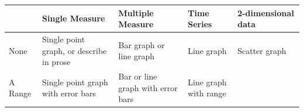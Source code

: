 \documentclass[]{book}
\begin{document}
\begin{longtable}[]{@{}lllll@{}}
\toprule
\begin{minipage}[b]{0.17\columnwidth}\raggedright\strut
\strut
\end{minipage} & \begin{minipage}[b]{0.33\columnwidth}\raggedright\strut
Single Measure\strut
\end{minipage} & \begin{minipage}[b]{0.14\columnwidth}\raggedright\strut
Multiple Measure\strut
\end{minipage} & \begin{minipage}[b]{0.10\columnwidth}\raggedright\strut
Time Series\strut
\end{minipage} & \begin{minipage}[b]{0.12\columnwidth}\raggedright\strut
2-dimensional data\strut
\end{minipage}\tabularnewline
\midrule
\endhead
\begin{minipage}[t]{0.17\columnwidth}\raggedright\strut
None\strut
\end{minipage} & \begin{minipage}[t]{0.33\columnwidth}\raggedright\strut
Single point graph, or describe in prose\strut
\end{minipage} & \begin{minipage}[t]{0.14\columnwidth}\raggedright\strut
Bar graph or line graph\strut
\end{minipage} & \begin{minipage}[t]{0.10\columnwidth}\raggedright\strut
Line graph\strut
\end{minipage} & \begin{minipage}[t]{0.12\columnwidth}\raggedright\strut
Scatter graph\strut
\end{minipage}\tabularnewline
\begin{minipage}[t]{0.17\columnwidth}\raggedright\strut
A Range\strut
\end{minipage} & \begin{minipage}[t]{0.33\columnwidth}\raggedright\strut
Single point graph with error bars\strut
\end{minipage} & \begin{minipage}[t]{0.14\columnwidth}\raggedright\strut
Bar or line graph with error bars\strut
\end{minipage} & \begin{minipage}[t]{0.10\columnwidth}\raggedright\strut
Line graph with range\strut
\end{minipage} & \begin{minipage}[t]{0.12\columnwidth}\raggedright\strut

\end{minipage}
\end{longtable}
\end{document}
